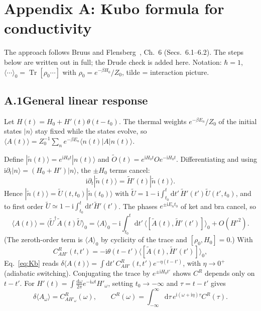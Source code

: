 \providecommand{\ii}{\mathrm{i}}
\providecommand{\dd}{\mathrm{d}}
\providecommand{\avg}[1]{\langle #1 \rangle}
\providecommand{\Tr}{\operatorname{Tr}}
\section*{Appendix A: Kubo formula for conductivity}\label{app:kubo}

\noindent The approach follows Bruus and Flensberg~\cite{BruusFlensberg}, Ch.~6 (Secs.~6.1--6.2). The steps below are written out in full; the Drude check is added here. Notation: $\hbar=1$, $\avg{\cdots}_0=\Tr[\rho_0\cdots]$ with $\rho_0=e^{-\beta H_0}/Z_0$, tilde = interaction picture.

\subsection*{A.1\quad General linear response}
Let $H(t)=H_0+H'(t)\theta(t-t_0)$. The thermal weights $e^{-\beta E_n}/Z_0$ of the initial states $|n\rangle$ stay fixed while the states evolve, so $\avg{A(t)}=Z_0^{-1}\sum_n e^{-\beta E_n}\langle n(t)|A|n(t)\rangle$.

Define $|\tilde n(t)\rangle=e^{\ii H_0t}|n(t)\rangle$ and $\tilde O(t)=e^{\ii H_0t}Oe^{-\ii H_0t}$. Differentiating and using $\ii\partial_t|n\rangle=(H_0+H')|n\rangle$, the $\pm H_0$ terms cancel:
\begin{equation}
\ii\partial_t|\tilde n(t)\rangle=\tilde H'(t)|\tilde n(t)\rangle .
\end{equation}
Hence $|\tilde n(t)\rangle=\tilde U(t,t_0)|\tilde n(t_0)\rangle$ with $\tilde U=1-\ii\int_{t_0}^t\dd t'\,\tilde H'(t')\tilde U(t',t_0)$, and to first order $\tilde U\simeq1-\ii\int_{t_0}^t\dd t'\tilde H'(t')$. The phases $e^{\pm\ii E_nt_0}$ of ket and bra cancel, so
\begin{equation}
\avg{A(t)}=\big\langle\tilde U^\dagger\tilde A(t)\tilde U\big\rangle_0
=\avg{A}_0-\ii\int_{t_0}^{t}\dd t'\,\avg{[\tilde A(t),\tilde H'(t')]}_0+O(H'^2).
\label{eq:Kb}
\end{equation}
(The zeroth-order term is $\avg{A}_0$ by cyclicity of the trace and $[\rho_0,H_0]=0$.) With
\begin{equation}
C^R_{AH'}(t,t')=-\ii\theta(t-t')\avg{[\tilde A(t),\tilde H'(t')]}_0 ,
\end{equation}
Eq.~\eqref{eq:Kb} reads $\delta\avg{A(t)}=\int\dd t'\,C^R_{AH'}(t,t')e^{-\eta(t-t')}$, with $\eta\to0^+$ (adiabatic switching). Conjugating the trace by $e^{\pm\ii H_0t'}$ shows $C^R$ depends only on $t-t'$. For $H'(t)=\int\frac{\dd\omega}{2\pi}e^{-\ii\omega t}H'_\omega$, setting $t_0\to-\infty$ and $\tau=t-t'$ gives
\begin{equation}
\delta\avg{A_\omega}=C^R_{AH'_\omega}(\omega),\qquad
C^R(\omega)=\int_{-\infty}^{\infty}\dd\tau\,e^{\ii(\omega+\ii\eta)\tau}C^R(\tau).
\end{equation}

